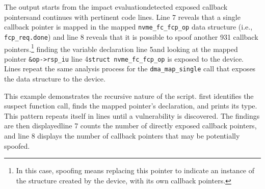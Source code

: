 The output starts from the impact evaluation\DIFdelbegin {}\DIFdelend \DIFaddbegin {}\DIFaddend detected exposed callback pointers\DIFdelbegin \DIFdel{) }\DIFdelend \DIFaddbegin \DIFadd{, }\DIFaddend and continues with pertinent code lines. %
Line 7 reveals \DIFdelbegin {}\DIFdelend that a single callback pointer is mapped in the mapped \texttt{nvme\_fc\_fcp\_op} data structure (i.e., \texttt{fcp\_req.done}) and line 8 reveals that it is possible to spoof another 931 callback pointers.\footnote{In this case, spoofing means replacing this pointer to indicate an instance of the structure created by the device, with its own callback pointers.}
\DIFdelbegin {}%
\DIFdelend \DIFaddbegin {}\DIFaddend finding the variable declaration \DIFdelbegin {}\DIFdelend \DIFaddbegin {}\DIFaddend line 5\DIFdelbegin \DIFdel{) }\DIFdelend \DIFaddbegin \DIFadd{, }\DIFaddend and looking at the mapped pointer \DIFdelbegin {}\DIFdelend \texttt{\&op->rsp\_iu} \DIFdelbegin {}\DIFdelend \DIFaddbegin {}\DIFaddend line 4\DIFdelbegin {}\DIFdelend \DIFaddbegin \DIFadd{, }\tool {}\DIFaddend \texttt{struct nvme\_fc\_fcp\_op} is exposed to the device. Lines \DIFdelbegin {}\DIFdelend \DIFaddbegin {}\DIFaddend repeat the same analysis process for the \texttt{dma\_map\_single} call that exposes the data structure to the device. 

This example demonstrates the recursive nature of the script.
\tool first identifies the suspect function call, \DIFdelbegin {}\DIFdelend finds the mapped pointer's declaration, and \DIFdelbegin {}\DIFdelend \DIFaddbegin {}\DIFaddend prints its type. This pattern repeats itself in lines \DIFdelbegin {}\DIFdelend \DIFaddbegin {}\DIFaddend until a vulnerability is discovered. The findings are then displayed\DIFdelbegin \DIFdel{; }\DIFdelend \DIFaddbegin \DIFadd{: }\DIFaddend line 7 counts the number of directly exposed callback pointers, and line 8 displays the number of callback pointers that may be potentially spoofed.



